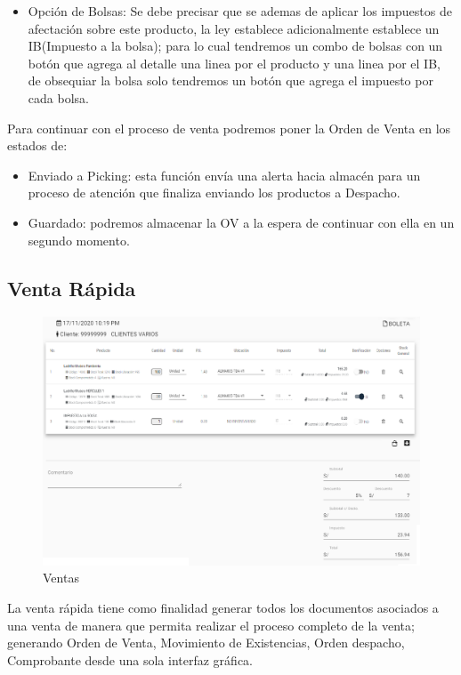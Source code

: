 \documentclass[pdftex,12pt,oneside,a4paper,spanish, english, brazil]{abntex2}
\begin{document}
\begin{sloppypar}
\begin{itemize}
         	\item Opción de Bolsas: Se debe precisar que se ademas de aplicar los impuestos de afectación sobre este producto, la ley establece adicionalmente establece un IB(Impuesto a la bolsa); para lo cual tendremos un combo de bolsas con un botón que agrega al detalle una linea por el producto y
         	una linea  por el IB, de obsequiar la bolsa solo tendremos un botón que agrega el impuesto
         	por cada bolsa.
         	\end{itemize}
              Para continuar con el proceso de venta podremos poner la Orden de Venta en los estados de:
              \begin{itemize}
              	\item Enviado a Picking: esta función envía una alerta hacia almacén para un proceso de atención que finaliza enviando los productos a Despacho.
              	\item Guardado: podremos almacenar la OV a la espera de continuar con ella en un segundo momento.
              \end{itemize}
              \subsection{Venta Rápida}
              \begin{figure}[h!]
              	\centering
              	\caption{Ventas} \label{fig:maia}
              	\includegraphics[width=0.65\linewidth,frame=0.5pt 5pt]{img/VENTA}
              \end{figure}
              La venta rápida tiene como finalidad generar todos los documentos asociados a una venta de manera que permita realizar el proceso completo de la venta; generando Orden de Venta, Movimiento de Existencias, Orden despacho, Comprobante desde una sola interfaz gráfica.\\
              

\end{sloppypar}
\end{document}
